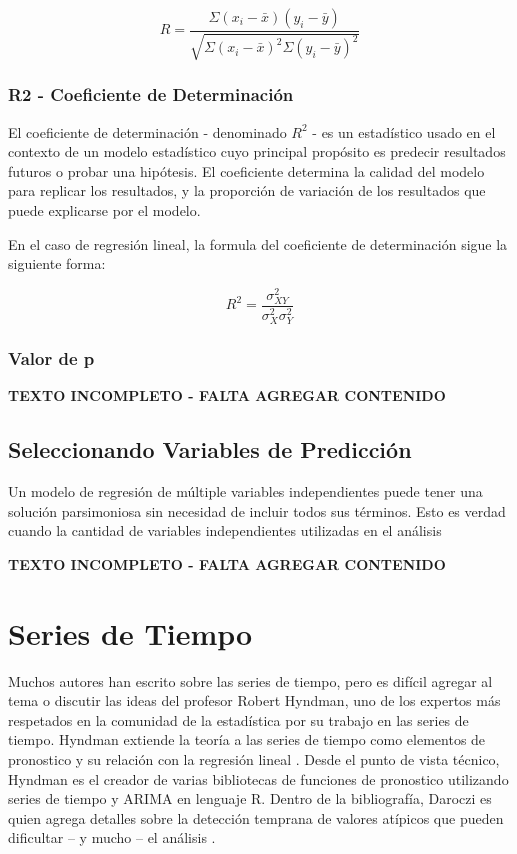 \begin{spacing}{1.5}
\[R = \frac{\Sigma(x_i - \bar{x})(y_i - \bar{y})}{\sqrt{\Sigma(x_i - \bar{x})^2\Sigma(y_i - \bar{y})^2}}\]

\subsubsection{R2 - Coeficiente de Determinación}
El coeficiente de determinación - denominado \(R^{2}\) - es un estadístico usado en el contexto de un modelo estadístico cuyo principal propósito es predecir resultados futuros o probar una hipótesis. El coeficiente determina la calidad del modelo para replicar los resultados, y la proporción de variación de los resultados que puede explicarse por el modelo. 

En el caso de regresión lineal, la formula del coeficiente de determinación sigue la siguiente forma:

\[R^{2} = \frac{\sigma^{2}_{XY}}{\sigma^{2}_{X}\sigma^{2}_{Y}}\]

\subsubsection{Valor de p}
\textbf{TEXTO INCOMPLETO - FALTA AGREGAR CONTENIDO}

\subsection{Seleccionando Variables de Predicción}
Un modelo de regresión de múltiple variables independientes puede tener una solución parsimoniosa sin necesidad de incluir todos sus términos. Esto es verdad cuando la cantidad de variables independientes utilizadas en el análisis 

\textbf{TEXTO INCOMPLETO - FALTA AGREGAR CONTENIDO}

\section{Series de Tiempo}
Muchos autores han escrito sobre las series de tiempo, pero es difícil agregar al tema o discutir las ideas del profesor Robert Hyndman, uno de los expertos más respetados en la comunidad de la estadística por su trabajo en las series de tiempo. Hyndman extiende la teoría a las series de tiempo como elementos de pronostico y su relación con la regresión lineal \cite{hyndman}. Desde el punto de vista técnico, Hyndman es el creador de varias bibliotecas de funciones de pronostico utilizando series de tiempo y ARIMA en lenguaje R. Dentro de la bibliografía, Daroczi es quien agrega detalles sobre la detección temprana de valores atípicos que pueden dificultar – y mucho – el análisis \cite{daroczi}. 


\end{spacing}
